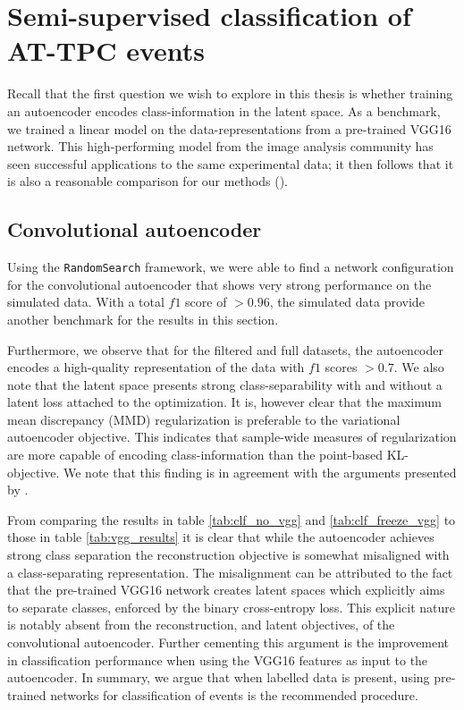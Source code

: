 \section{Semi-supervised classification of AT-TPC events}
Recall that the first question we wish to explore in this thesis is whether training an autoencoder encodes class-information in the latent space. As a benchmark, we trained a linear model on the data-representations from a pre-trained VGG16 network. This high-performing model from the image analysis community has seen successful applications to the same experimental data; it then follows that it is also a reasonable comparison for our methods (\cite{Kuchera2019}). 

\subsection{Convolutional autoencoder}
Using the \lstinline{RandomSearch} framework, we were able to find a network configuration for the convolutional autoencoder that shows very strong performance on the simulated data. With a total $f1$ score of $>0.96$, the simulated data provide another benchmark for the results in this section.

 Furthermore, we observe that for the filtered and full datasets, the autoencoder encodes a high-quality representation of the data with $f1$ scores $>0.7$. We also note that the latent space presents strong class-separability with and without a latent loss attached to the optimization. It is, however clear that the maximum mean discrepancy (MMD) regularization is preferable to the variational autoencoder objective. This indicates that sample-wide measures of regularization are more capable of encoding class-information than the point-based KL-objective. We note that this finding is in agreement with the arguments presented by \citet{Zhao}. 

 From comparing the results in table \ref{tab:clf_no_vgg} and \ref{tab:clf_freeze_vgg} to those in table \ref{tab:vgg_results} it is clear that while the autoencoder achieves strong class separation the reconstruction objective is somewhat misaligned with a class-separating representation. The misalignment can be attributed to the fact that the pre-trained VGG16 network creates latent spaces which explicitly aims to separate classes, enforced by the binary cross-entropy loss. This explicit nature is notably absent from the reconstruction, and latent objectives, of the convolutional autoencoder. Further cementing this argument is the improvement in classification performance when using the VGG16 features as input to the autoencoder. In summary, we argue that when labelled data is present, using pre-trained networks for classification of events is the recommended procedure.


